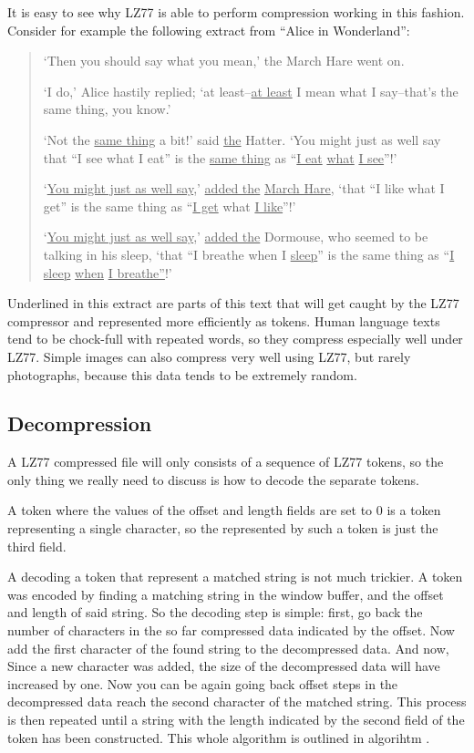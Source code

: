It is easy to see why LZ77 is able to perform compression working in
this fashion. Consider for example the following extract from ``Alice in
Wonderland'':

\begin{quote}
  `Then you should say what you mean,' the March Hare went on.

  `I do,' Alice hastily replied; `at least--\underline{at least} I
  mean what I say--that's the same thing, you know.'

  `Not the \underline{same thing} a bit!' said \underline{the} Hatter.
  `You might just as well say that ``I see what I eat'' is the
  \underline{same thing} as ``\underline{I eat} \underline{what}
  \underline{I see}''!'

  `\underline{You might just as well say},' \underline{added the}
  \underline{March Hare}, `that ``I like what I get'' is the same
  thing as ``\underline{I get} what \underline{I like}''!'

  `\underline{You might just as well say},' \underline{added the}
  Dormouse, who seemed to be talking in his sleep, `that ``I breathe
  when I \underline{sleep}'' is the same thing as ``\underline{I
    sleep} \underline{when} \underline{I breathe''}!'

\end{quote}

Underlined in this extract are parts of this text that will get caught
by the LZ77 compressor and represented more efficiently as
tokens. Human language texts tend to be chock-full with repeated words,
so they compress especially well under LZ77. Simple images can also
compress very well using LZ77, but rarely photographs, because this
data tends to be extremely random.

\subsection{Decompression}

A LZ77 compressed file will only consists of a sequence of LZ77
tokens, so the only thing we really need to discuss is how to decode
the separate tokens.

A token where the values of the offset and length fields are set to
$0$ is a token representing a single character, so the represented by
such a token is just the third field.

A decoding a token that represent a matched string is not much
trickier. A token was encoded by finding a matching string in the
window buffer, and the offset and length of said string. So the
decoding step is simple: first, go back the number of characters in
the so far compressed data indicated by the offset. Now add the first
character of the found string to the decompressed data. And now, Since a new
character was added, the size of the decompressed data will have
increased by one. Now you can be again going back offset steps in the
decompressed data reach the second character of the matched
string. This process is then repeated until a string with the length
indicated by the second field of the token has been constructed. This
whole algorithm is outlined in algorihtm \label{alg:dec-lzone-token}.

